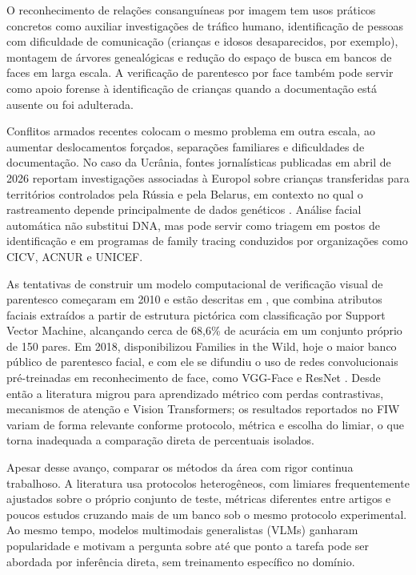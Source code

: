 O reconhecimento de relações consanguíneas por imagem tem usos práticos concretos como auxiliar investigações de tráfico humano, identificação de pessoas com dificuldade de comunicação (crianças e idosos desaparecidos, por exemplo), montagem de árvores genealógicas e redução do espaço de busca em bancos de faces em larga escala. A verificação de parentesco por face também pode servir como apoio forense à identificação de crianças quando a documentação está ausente ou foi adulterada.

Conflitos armados recentes colocam o mesmo problema em outra escala, ao aumentar deslocamentos forçados, separações familiares e dificuldades de documentação. No caso da Ucrânia, fontes jornalísticas publicadas em abril de 2026 reportam investigações associadas à Europol sobre crianças transferidas para territórios controlados pela Rússia e pela Belarus, em contexto no qual o rastreamento depende principalmente de dados genéticos \cite{europol_ucrania_2026, rtp_dna_ucrania_2026}. Análise facial automática não substitui DNA, mas pode servir como triagem em postos de identificação e em programas de family tracing conduzidos por organizações como CICV, ACNUR e UNICEF.

As tentativas de construir um modelo computacional de verificação visual de parentesco começaram em 2010 e estão descritas em , que combina atributos faciais extraídos a partir de estrutura pictórica \cite{felzenszwalb2005pictorial} com classificação por Support Vector Machine, alcançando cerca de 68{,}6\% de acurácia em um conjunto próprio de 150 pares. Em 2018,  disponibilizou Families in the Wild, hoje o maior banco público de parentesco facial, e com ele se difundiu o uso de redes convolucionais pré-treinadas em reconhecimento de face, como VGG-Face \cite{parkhi2015deep} e ResNet \cite{wen2016discriminative}. Desde então a literatura migrou para aprendizado métrico com perdas contrastivas, mecanismos de atenção e Vision Transformers; os resultados reportados no FIW variam de forma relevante conforme protocolo, métrica e escolha do limiar, o que torna inadequada a comparação direta de percentuais isolados.

Apesar desse avanço, comparar os métodos da área com rigor continua trabalhoso. A literatura usa protocolos heterogêneos, com limiares frequentemente ajustados sobre o próprio conjunto de teste, métricas diferentes entre artigos e poucos estudos cruzando mais de um banco sob o mesmo protocolo experimental. Ao mesmo tempo, modelos multimodais generalistas (VLMs) ganharam popularidade e motivam a pergunta sobre até que ponto a tarefa pode ser abordada por inferência direta, sem treinamento específico no domínio.

